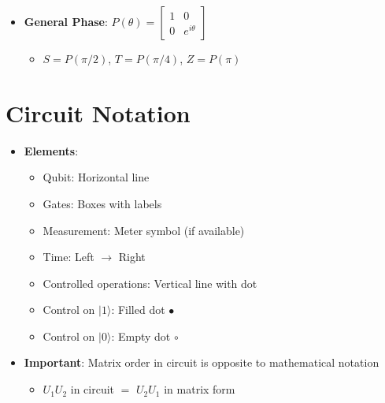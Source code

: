 \begin{multicols}{3}
\begin{itemize}[leftmargin=*,nosep,topsep=0pt]
    \item \textbf{General Phase}: $P(\theta) = \begin{bmatrix} 1 & 0 \\ 0 & e^{i\theta} \end{bmatrix}$
    \begin{itemize}[nosep]
        \item $S = P(\pi/2)$, $T = P(\pi/4)$, $Z = P(\pi)$
    \end{itemize}
\end{itemize}

\section*{Circuit Notation}
\begin{itemize}[leftmargin=*,nosep,topsep=0pt]
    \item \textbf{Elements}:
    \begin{itemize}[nosep]
        \item Qubit: Horizontal line
        \item Gates: Boxes with labels
        \item Measurement: Meter symbol (if available)
        \item Time: Left $\to$ Right
        \item Controlled operations: Vertical line with dot
        \item Control on $|1\rangle$: Filled dot $\bullet$
        \item Control on $|0\rangle$: Empty dot $\circ$
    \end{itemize}
    \item \textbf{Important}: Matrix order in circuit is opposite to mathematical notation
    \begin{itemize}[nosep]
        \item $U_1 U_2$ in circuit $=$ $U_2 U_1$ in matrix form
    \end{itemize}
\end{itemize}


\end{multicols}

